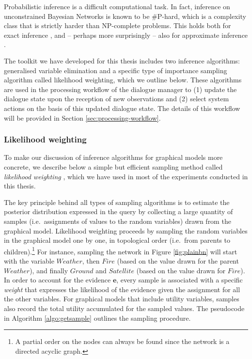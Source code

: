 Probabilistic inference is a difficult computational task.  In fact, inference on unconstrained Bayesian Networks is known to be {\#}P-hard, which is a complexity class that is strictly harder than NP-complete problems.  This holds both for exact inference \citep{Cooper90}, and -- perhaps more surprisingly -- also for approximate inference \citep{Dagum1993}.  


The \opendial{} toolkit we have developed for this thesis includes two inference algorithms: generalised variable elimination \citep[][p. 1103]{Koller+Friedman:09} and a specific type of importance sampling algorithm called likelihood weighting, which we outline below. These algorithms are used in the processing workflow of the dialogue manager to (1) update the dialogue state upon the reception of new observations and (2) select system actions on the basis of this updated dialogue state. The details of this workflow will be provided in Section \ref{sec:processing-workflow}.  

\subsubsection*{Likelihood weighting} 

To make our discussion of inference algorithms for graphical models more concrete, we describe below a simple but efficient sampling method called \textit{likelihood weighting} \citep{FungC89}, which we have used in most of the experiments conducted in this thesis.  

The key principle behind all types of sampling algorithms is to estimate the posterior distribution expressed in the query by collecting a large quantity of samples (i.e.\ assignments of values to the random variables) drawn from the graphical model.  Likelihood weighting proceeds by sampling the random variables in the graphical model one by one, in topological order (i.e.\ from parents to children).\footnote{A partial order on the nodes  can always be found since the network is a directed acyclic graph.} For instance, sampling the network in Figure \ref{fig:plainbn} will start with the variable $\mathit{Weather}$, then $\mathit{Fire}$ (based on the value drawn for the parent $\mathit{Weather}$), and finally $\mathit{Ground}$ and $\mathit{Satellite}$ (based on the value drawn for $\mathit{Fire}$).  In order to account for the evidence $\mathbf{e}$, every sample is associated with a specific \textit{weight} that expresses the likelihood of the evidence given the assignment for all the other variables.  For graphical models that include utility variables, samples also record the total utility accumulated for the sampled values. The pseudocode in Algorithm \ref{algo:getsample} outlines the sampling procedure.  

